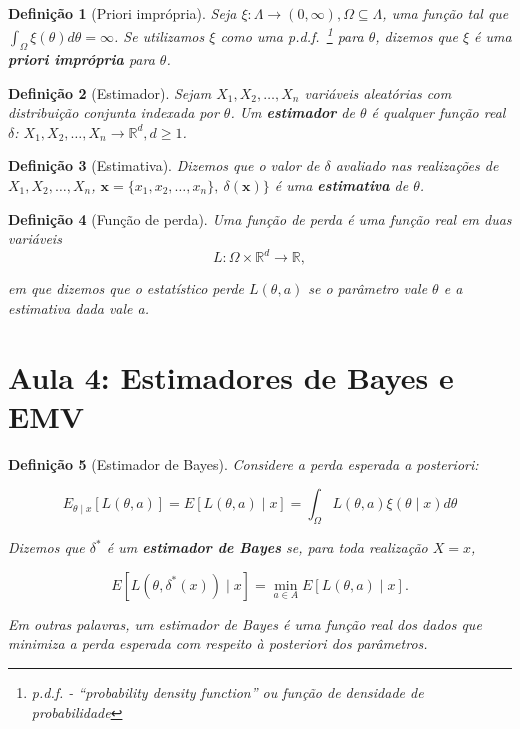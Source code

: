 \documentclass{article}
\newtheorem{definition}{Definição}
\begin{document}
\begin{definition}[Priori imprópria]
Seja $\xi : \Lambda \rightarrow (0, \infty), \Omega \subseteq \Lambda$, uma função tal que $\int_\Omega \xi(\theta) d \theta = \infty$. Se utilizamos $\xi$ como uma p.d.f.~\footnote{p.d.f. - ``probability density function'' ou função de densidade de probabilidade} para $\theta$, dizemos que $\xi$ é uma \textbf{priori imprópria} para $\theta$.
\end{definition}

\begin{definition}[Estimador]
Sejam $X_1, X_2, \ldots, X_n$ variáveis aleatórias com distribuição conjunta indexada por $\theta$. Um \textbf{estimador} de $\theta$ é qualquer função real $\delta$: $X_1, X_2, \ldots, X_n \rightarrow \mathbb{R}^d, d \geq 1$.
\end{definition}

\begin{definition}[Estimativa]
Dizemos que o valor de $\delta$ avaliado nas realizações de $X_1, X_2, \ldots, X_n$, $\textbf{x} = \{x_1, x_2, \ldots, x_n\}, \ \delta(\textbf{x})\}$ é uma \textbf{estimativa} de $\theta$.
\end{definition}

\begin{definition}[Função de perda]
Uma função de perda é uma função real em duas variáveis 
\begin{equation}
L: \Omega \times \mathbb{R}^d \rightarrow \mathbb{R},
\end{equation}

em que dizemos que o estatístico \textit{perde} $L(\theta, a)$ se o parâmetro vale $\theta$ e a estimativa dada vale a.
\end{definition}

\section*{Aula 4: Estimadores de Bayes e EMV}
\label{s4}
\begin{definition}[Estimador de Bayes]
Considere a perda esperada a posteriori:

\begin{equation}
E_{\theta \mid x} [L(\theta, a)] = E[L(\theta, a) \mid x] = \int_\Omega L(\theta, a) \xi (\theta \mid x) d \theta
\end{equation}

Dizemos que $\delta^*$ é um \textbf{estimador de Bayes} se, para toda realização $X = x$,

\begin{equation}
E[L(\theta, \delta^*(x)) \mid x] = \min_{a \in A} E[L(\theta, a) \mid x].
\end{equation}

Em outras palavras, um estimador de Bayes é uma função real dos dados que minimiza a perda esperada com respeito à posteriori dos parâmetros.
\end{definition}
\end{document}
